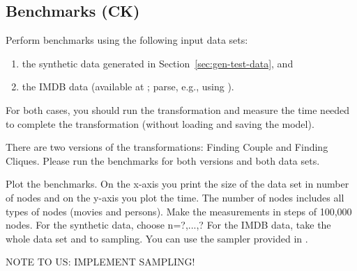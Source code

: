 \documentclass[a4paper]{article}
\begin{document}
\subsection{Benchmarks (CK)}

Perform benchmarks using the following input data sets:
\begin{enumerate}
\item the synthetic data generated in Section~\ref{sec:gen-test-data}, and 
\item the IMDB data (available at \cite{IMDBDATA}; parse, e.g., using \cite{IMDB2EMF}).
\end{enumerate}
For both cases, you should run the transformation and measure 
the time needed to complete the transformation (without loading 
and saving the model).

There are two versions of the transformations: Finding Couple and Finding Cliques.
Please run the benchmarks for both versions and both data sets.


Plot the benchmarks. On the x-axis you print the size of the data set
in number of nodes and on the y-axis you plot the time. The number of nodes
includes all types of nodes (movies and persons). Make the measurements in
steps of 100,000 nodes. For the synthetic data, choose n=?,...,?
For the IMDB data, take the whole data set and to sampling. You can use
the sampler provided in \cite{IMDB2EMF}. 

NOTE TO US: IMPLEMENT SAMPLING!





\end{document}
